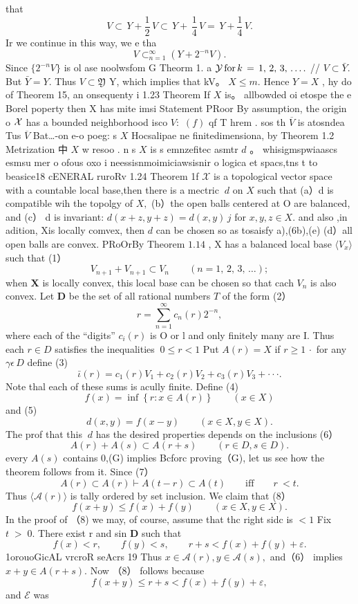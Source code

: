 that $$ V\subset\,Y+{\textstyle{\frac{1}{2}}}\,V\subset\,Y+\,{\textstyle{\frac{1}{4}}}\,V=\,Y+{\textstyle{\frac{1}{4}}}\,V. $$ Ir we continue in this way, we e tha $$ V\subset_{n=1}^{\infty}(Y+2^{-n}V). $$ Since $\{2^{-n}V\}$ is ol ase noolwsfom G Theorm 1. a ${{\cal{Y}}}\,\mathrm{for}\,k\,=\,1,\,2,\,3,\,\ldots.$ // $V\subset{\bar{Y}}.$ But ${\bar{Y}}=Y.$ Thus $V\subset{\mathfrak{Y}}$ Y, which implies that kV。 $X\leq m.$ Hence $Y=X$ , hy do of Theorem 15, an onsequenty i 1.23 Theorem If $\textstyle X$ is。 allbowded oi etospe the e Borel poperty then X has mite imsi Statement PRoor By assumption, the origin o $\textstyle{\cal{X}}$ has a bounded neighborhood isco $V{\mathrm{:}}$ $(f)$ qf T hrem . sos th $\overline{{V}}$ is atosndea Tus $\overline{{V}}$ Bat…-on e-o poeg: s $\textstyle X$ Hocsalipae ne finitedimensiona, by Theorem 1.2 Metrization 中 $\textstyle X$ w resoo . n s $\textstyle X$ is s emnzefitec asmtr $\scriptstyle d$ 。 whisigmspwiaascs esmsu mer o ofous oxo i neessisnmoimiciawsisnir o logica et spacs,tns t to beasice18 cENERAL ruroRv 1.24 Theorem 1f $\textstyle{\mathcal{X}}$ is a topological vector space with a countable local base,then there is a mectric $\ d$ on $\textstyle X$ such that (a）d is compatible wih the topolgy of $X,$ (b）the open balls centered at O are balanced, and (c） d is invariant: $d(x+z,y+z)=d(x,y)\,j$ for $x,y,z\in X.$ and also ,in adition, Xis locally comvex, then $d$ can be chosen so as tosaisfy a),(6b),(e) (d）all open balls are convex. PRoOrBy Theorem $\scriptstyle{1.14}$ , X has a balanced local base $\langle V_{x}\rangle$ such that (1） $$ V_{n+1}+V_{n+1}\subset V_{n}\qquad(n=1,\,2,\,3,\,\ldots); $$ when ${\boldsymbol{X}}$ is locally convex, this local base can be chosen so that cach $V_{n}$ is also convex. Let ${\boldsymbol{D}}$ be the set of all rational numbers ${\mathbf{}}T$ of the form (2） $$ r=\sum_{n=1}^{\infty}c_{n}(r)2^{-n}, $$ where each of the “digits” $c_{i}(r)$ is O or l and only finitely many are I. Thus each $r\in D$ satisfies the inequalities $\ 0\leq r<1$ Put $A(r)=X$ if $r\geq1\,\cdot$ for any $\gamma\epsilon\,D$ define (3) $$ \bar{\iota}(r)=c_{1}(r)V_{1}+c_{2}(r)V_{2}+c_{3}(r)V_{3}+\cdot\cdot\cdot. $$ Note thal each of these sums is acully finite. Define (4) $$ f(x)=\operatorname*{inf}\left\{r:x\in A(r)\right\}\qquad(x\in X) $$ and (5) $$ d(x,y)=f(x-y)\qquad(x\in X,y\in X). $$ The prof that this $\ d$ has the desired properties depends on the inclusions (6） $$ A(r)+A(s)\subset A(r+s)\qquad(r\in D,s\in D). $$ every $A(s)$ contains 0,(G) implies Bcforc proving（G), let us see how the theorem follows from it. Since (7） $$ A(r)\subset A(r)\vdash A(t-r)\subset A(t)\qquad{\mathrm{iff}}\qquad r\ <t. $$ Thus $\langle{\mathcal{A}}(r)\rangle$ is tally ordered by set inclusion. We claim that (8） $$ f(x+y)\leq f(x)+f(y)\qquad(x\in X,y\in X). $$ In the proof of （8) we may, of course, assume that thc right sidc is $<1$ Fix $\scriptstyle t\;>\;0.$ There exist r and sin ${\boldsymbol{D}}$ such that $$ f(x)<r,\qquad f(y)<s,\qquad r+s<f(x)+f(y)+\varepsilon. $$1orouoGicAL vrcroR seAcrs 19 Thus $x\in{\mathcal{A}}(r),y\in{\mathcal{A}}(s),$ and（6） implies $x+y\in A(r+s).$ Now （8） follows because $$ f(x+y)\leq r+s<f(x)+f(y)+\varepsilon, $$ and $\scriptstyle{\mathcal{E}}$ was 
